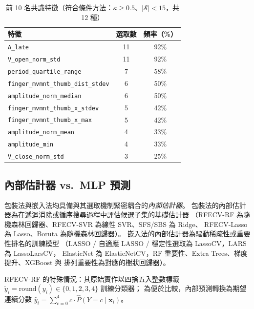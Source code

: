 \documentclass[12pt, a4paper]{article}
\begin{document}
\begin{table}[htbp]
    \centering
    \caption{前 10 名共識特徵（符合條件方法：$\kappa \geq 0.5$、$|\mathcal{S}|<15$，共 12 種）}
    \label{tab:feature_consensus}
    \renewcommand{\arraystretch}{1.2}
    \begin{tabular}{lcc}
        \toprule
        \textbf{特徵} & \textbf{選取數} & \textbf{頻率（\%）} \\
        \midrule
        \texttt{A\_late}                          & 11 & 92\% \\
        \texttt{V\_open\_norm\_std}               & 11 & 92\% \\
        \texttt{period\_quartile\_range}          &  7 & 58\% \\
        \texttt{finger\_mvmnt\_thumb\_dist\_stdev}&  6 & 50\% \\
        \texttt{amplitude\_norm\_median}          &  6 & 50\% \\
        \texttt{finger\_mvmnt\_thumb\_x\_stdev}   &  5 & 42\% \\
        \texttt{finger\_mvmnt\_thumb\_x\_max}     &  5 & 42\% \\
        \texttt{amplitude\_norm\_mean}            &  4 & 33\% \\
        \texttt{amplitude\_min}                   &  4 & 33\% \\
        \texttt{V\_close\_norm\_std}              &  3 & 25\% \\
        \bottomrule
    \end{tabular}
\end{table}

\subsection{內部估計器 vs.\ MLP 預測}

包裝法與嵌入法均具備與其選取機制緊密耦合的\emph{內部估計器}。
包裝法的內部估計器為在遞迴消除或循序搜尋過程中評估候選子集的基礎估計器
（RFECV-RF 為隨機森林回歸器、RFECV-SVR 為線性 SVR、SFS/SBS 為 Ridge、
RFECV-Lasso 為 Lasso、Boruta 為隨機森林回歸器）。
嵌入法的內部估計器為驅動稀疏性或重要性排名的訓練模型
（LASSO / 自適應 LASSO / 穩定性選取為 LassoCV，LARS 為 LassoLarsCV，
ElasticNet 為 ElasticNetCV，RF 重要性、Extra Trees、梯度提升、XGBoost 與
排列重要性為對應的樹狀回歸器）。

\noindent RFECV-RF 的特殊情況：其原始實作以四捨五入整數標籤
$\tilde{y}_i = \mathrm{round}(y_i) \in \{0,1,2,3,4\}$ 訓練分類器；
為便於比較，內部預測轉換為期望連續分數
$\hat{y}_i = \sum_{c=0}^{4} c \cdot \hat{P}(Y{=}c \mid \mathbf{x}_i)$。
\end{document}
